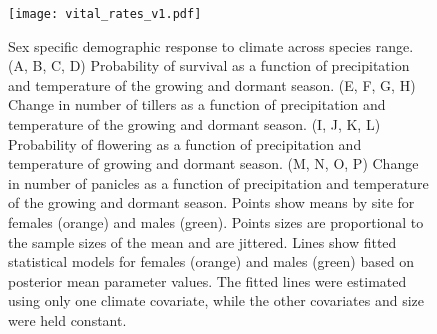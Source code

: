 \documentclass[9pt,twocolumn,twoside,lineno]{pnas-new}
\begin{document}
\begin{figure}[H]
\centering
\texttt{[image: vital\_rates\_v1.pdf]}
\caption{Sex specific demographic response to climate across species range.
			(A, B, C, D) Probability of survival as a function of precipitation and temperature of the growing and dormant season.
			(E, F, G, H) Change in number of tillers as a function of precipitation and temperature of the growing and dormant season.
			(I, J, K, L) Probability of flowering as a function of precipitation and temperature of growing and dormant season.
			(M, N, O, P) Change in number of panicles as a function of precipitation and temperature of the growing and dormant season.
			Points show means by site for females (orange) and males (green). 
			Points sizes are proportional to the sample sizes of the mean and are jittered.
			Lines show fitted statistical models for females (orange) and males (green) based on posterior mean parameter values.
			The fitted lines were estimated using only one climate covariate, while the other covariates and size were held constant. %
			}
\label{fig:vital_rates}
\end{figure}
\clearpage
\end{document}
